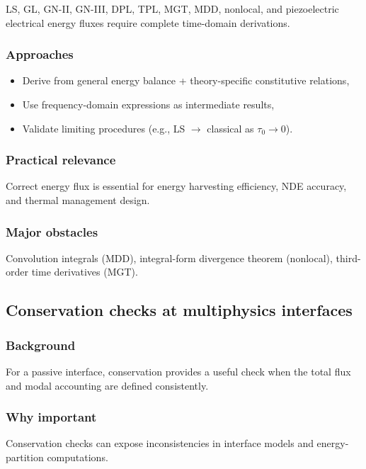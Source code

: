 LS, GL, GN-II, GN-III, DPL, TPL, MGT, MDD, nonlocal, and piezoelectric electrical energy fluxes require complete time-domain derivations.

\subsubsection{Approaches}

\begin{itemize}
\item Derive from general energy balance + theory-specific constitutive relations,
\item Use frequency-domain expressions as intermediate results,
\item Validate limiting procedures (e.g., LS $\to$ classical as $\tau_0 \to 0$).
\end{itemize}

\subsubsection{Practical relevance}

Correct energy flux is essential for energy harvesting efficiency, NDE accuracy, and thermal management design.

\subsubsection{Major obstacles}

Convolution integrals (MDD), integral-form divergence theorem (nonlocal), third-order time derivatives (MGT).

\subsection{Conservation checks at multiphysics interfaces}
\label{sec:15.2}

\subsubsection{Background}

For a passive interface, conservation provides a useful check when the total flux and modal accounting are defined consistently.

\subsubsection{Why important}

Conservation checks can expose inconsistencies in interface models and energy-partition computations.

